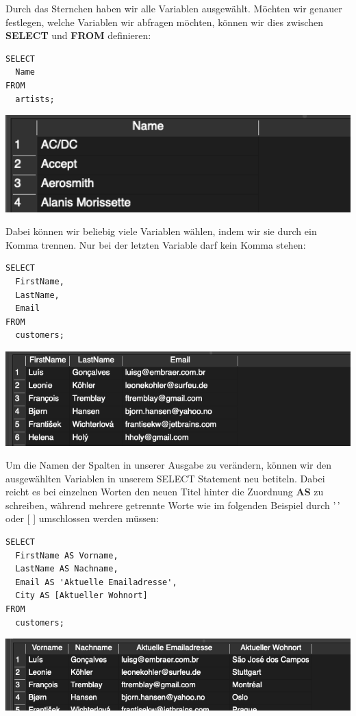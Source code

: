 \documentclass[
]{book}
\begin{document}
Durch das Sternchen haben wir alle Variablen ausgewählt. Möchten wir genauer festlegen, welche Variablen wir abfragen möchten, können wir dies zwischen \textbf{SELECT} und \textbf{FROM} definieren:

\begin{verbatim}
SELECT
  Name
FROM
  artists;
\end{verbatim}

\includegraphics[width=10.41667in,height=\textheight]{img-SELECT3.png}

Dabei können wir beliebig viele Variablen wählen, indem wir sie durch ein Komma trennen. Nur bei der letzten Variable darf kein Komma stehen:

\begin{verbatim}
SELECT
  FirstName,
  LastName,
  Email
FROM
  customers;
\end{verbatim}

\includegraphics[width=10.41667in,height=\textheight]{img-SELECT4.png}

Um die Namen der Spalten in unserer Ausgabe zu verändern, können wir den ausgewählten Variablen in unserem SELECT Statement neu betiteln. Dabei reicht es bei einzelnen Worten den neuen Titel hinter die Zuordnung \textbf{AS} zu schreiben, während mehrere getrennte Worte wie im folgenden Beispiel durch '\,' oder {[} {]} umschlossen werden müssen:

\begin{verbatim}
SELECT
  FirstName AS Vorname,
  LastName AS Nachname,
  Email AS 'Aktuelle Emailadresse',
  City AS [Aktueller Wohnort]
FROM
  customers;
\end{verbatim}

\includegraphics[width=10.41667in,height=\textheight]{img-SELECT5.png}
\end{document}
